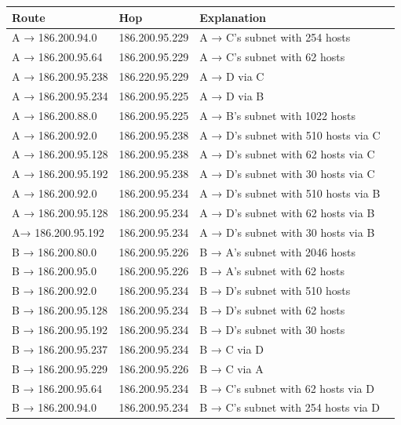 \documentclass[a4paper, titlepage,12pt]{article}
\begin{document}
		\begin{longtable}{|l|l|l|}

			\hline
			\textbf{Route} & \textbf{Hop} & \textbf{Explanation} \\
			\hline
			A → 186.200.94.0 & 186.200.95.229 & A →  C’s subnet with 254 hosts \\
			\hline
			A → 186.200.95.64 & 186.200.95.229 & A →  C’s subnet with 62 hosts \\
			\hline
			A → 186.200.95.238 & 186.220.95.229 & A →  D via C  \\
			\hline
			A → 186.200.95.234 & 186.200.95.225 & A →  D via B  \\
			\hline
			A → 186.200.88.0 & 186.200.95.225 & A →  B’s subnet with 1022 hosts \\
			\hline
			A → 186.200.92.0 & 186.200.95.238 & A →  D’s subnet with 510 hosts via C \\
			\hline
			A → 186.200.95.128 & 186.200.95.238 & A →  D’s subnet with 62 hosts via C \\
			\hline
			A → 186.200.95.192 & 186.200.95.238 & A →  D’s subnet with 30 hosts via C \\
			\hline
			A → 186.200.92.0 & 186.200.95.234 & A →  D’s subnet with 510 hosts via B \\
			\hline
			A → 186.200.95.128 & 186.200.95.234 & A →  D’s subnet with 62 hosts via B \\
			\hline
			A→ 186.200.95.192 & 186.200.95.234 & A →  D’s subnet with 30 hosts via B  \\
			\hline
			B → 186.200.80.0 & 186.200.95.226 & B →  A’s subnet with 2046 hosts \\
			\hline
			B → 186.200.95.0 & 186.200.95.226 & B →  A’s subnet with 62 hosts \\
			\hline
			B → 186.200.92.0 & 186.200.95.234 & B →  D’s subnet with 510 hosts \\
			\hline
			B → 186.200.95.128 & 186.200.95.234 & B →  D’s subnet with 62 hosts \\
			\hline
			B → 186.200.95.192 & 186.200.95.234 & B →  D’s subnet with 30 hosts \\
			\hline
			B → 186.200.95.237 & 186.200.95.234 & B →  C via D \\
			\hline
			B → 186.200.95.229 & 186.200.95.226 & B →  C via A \\
			\hline
			B → 186.200.95.64 & 186.200.95.234 & B →  C’s subnet with 62 hosts via D \\
			\hline
			B → 186.200.94.0 & 186.200.95.234 & B →  C’s subnet with 254 hosts via D \	\\

\end{longtable}
\end{document}
